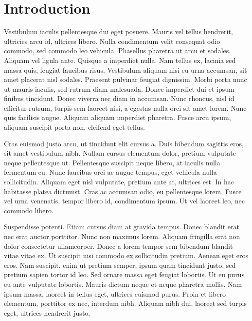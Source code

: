 \section{Introduction}%
\label{sec:introduction}
Vestibulum iaculis pellentesque dui eget posuere. Mauris vel tellus hendrerit, ultricies arcu id, ultrices libero. Nulla condimentum velit consequat odio commodo, sed commodo leo vehicula. Phasellus pharetra ut arcu et sodales. Aliquam vel ligula ante. Quisque a imperdiet nulla. Nam tellus ex, lacinia sed massa quis, feugiat faucibus risus. Vestibulum aliquam nisi eu urna accumsan, sit amet placerat nisl sodales. Praesent pulvinar feugiat dignissim. Morbi porta nunc ut mauris iaculis, sed rutrum diam malesuada. Donec imperdiet dui et ipsum finibus tincidunt. Donec viverra nec diam in accumsan. Nunc rhoncus, nisl id efficitur rutrum, turpis sem laoreet nisi, a egestas nulla orci sit amet lorem. Nunc quis facilisis augue. Aliquam aliquam imperdiet pharetra. Fusce arcu ipsum, aliquam suscipit porta non, eleifend eget tellus.

Cras euismod justo arcu, ut tincidunt elit cursus a. Duis bibendum sagittis eros, sit amet vestibulum nibh. Nullam cursus elementum dolor, pretium vulputate neque pellentesque ut. Pellentesque suscipit neque libero, at iaculis nulla fermentum eu. Nunc faucibus orci ac augue tempus, eget vehicula nulla sollicitudin. Aliquam eget nisl vulputate, pretium ante at, ultrices est. In hac habitasse platea dictumst. Cras ac accumsan odio, eu pellentesque lorem. Fusce vel urna venenatis, tempor libero id, condimentum ipsum. Ut vel laoreet leo, nec commodo libero.

Suspendisse potenti. Etiam cursus diam at gravida tempus. Donec blandit erat nec erat auctor porttitor. Nunc non maximus lorem. Aliquam fringilla erat non dolor consectetur ullamcorper. Donec a lorem tempor sem bibendum blandit vitae vitae ex. Ut suscipit nisi commodo ex sollicitudin pretium. Aenean eget eros eros. Nam suscipit, enim ut pretium semper, ipsum quam tincidunt justo, sed pretium sapien tortor id leo. Sed ornare massa eget feugiat lobortis. Ut eu purus eu ante vulputate lobortis. Mauris dictum neque et neque pharetra mollis. Nam ipsum massa, laoreet in tellus eget, ultrices euismod purus. Proin et libero elementum, porttitor ex nec, interdum nibh. Aliquam nibh dui, laoreet sed turpis eget, ultrices hendrerit justo.